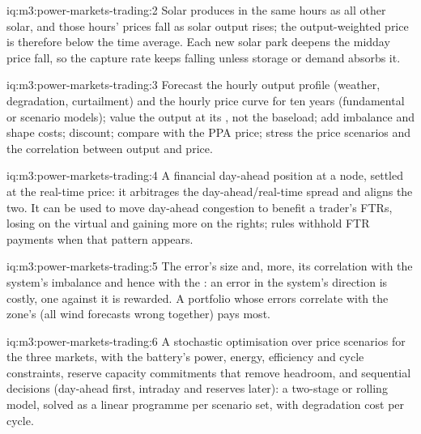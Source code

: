 \begin{solution}{iq:m3:power-markets-trading:2}
Solar produces in the same hours as all other solar, and those hours' prices fall as solar output
rises; the output-weighted price is therefore below the time average. Each new solar park deepens
the midday price fall, so the capture rate keeps falling unless storage or demand absorbs it.
\end{solution}

\begin{solution}{iq:m3:power-markets-trading:3}
Forecast the hourly output profile (weather, degradation, curtailment) and the hourly price
curve for ten years (fundamental or scenario models); value the output at its , not
the baseload; add imbalance and shape costs; discount; compare with the PPA price; stress the
price scenarios and the correlation between output and price.
\end{solution}

\begin{solution}{iq:m3:power-markets-trading:4}
A financial day-ahead position at a node, settled at the real-time price: it arbitrages the
day-ahead/real-time spread and aligns the two. It can be used to move day-ahead congestion to
benefit a trader's FTRs, losing on the virtual and gaining more on the rights; rules withhold FTR
payments when that pattern appears.
\end{solution}

\begin{solution}{iq:m3:power-markets-trading:5}
The error's size and, more, its correlation with the system's imbalance and hence with the
: an error in the system's direction is costly, one against it is rewarded. A
portfolio whose errors correlate with the zone's (all wind forecasts wrong together) pays most.
\end{solution}

\begin{solution}{iq:m3:power-markets-trading:6}
A stochastic optimisation over price scenarios for the three markets, with the battery's power,
energy, efficiency and cycle constraints, reserve capacity commitments that remove headroom, and
sequential decisions (day-ahead first, intraday and reserves later): a two-stage or rolling
model, solved as a linear programme per scenario set, with degradation cost per cycle.
\end{solution}
